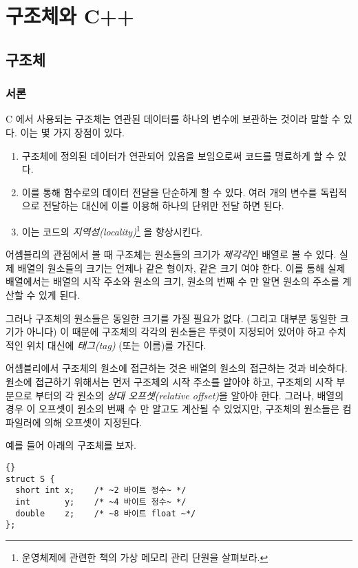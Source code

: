 ﻿%
\chapter{구조체와 C++}

\section{구조체}

\subsection{서론}

C 에서 사용되는 구조체는 연관된 데이터를 하나의 변수에 보관하는 것이라
말할 수 있다. 이는 몇 가지 장점이 있다. 

\begin{enumerate}
\item 구조체에 정의된 데이터가 연관되어 있음을 보임으로써 코드를 
      명료하게 할 수 있다. 
\item 이를 통해 함수로의 데이터 전달을 단순하게 할 수 있다. 여러 개의 변수를
      독립적으로 전달하는 대신에 이를 이용해 하나의 단위만 전달 하면 된다.
\item 이는 코드의 \emph{지역성(locality)}\footnote{운영체제에 관련한 책의 가상 메모리 관리 단원을 살펴보라.} 을 향상시킨다.
\end{enumerate}

어셈블리의 관점에서 볼 때 구조체는 원소들의 크기가 \emph{제각각}인 배열로 볼 수 있다. 실제 배열의
원소들의 크기는 언제나 같은 형이자, 같은 크기 여야 한다. 이를 통해 실제 배열에서는 배열의 시작 주소와
원소의 크기, 원소의 번째 수 만 알면 원소의 주소를 계산할 수 있게 된다.

그러나 구조체의 원소들은 동일한 크기를 가질 필요가 없다. (그리고 대부분 동일한 크기가 아니다)
이 때문에 구조체의 각각의 원소들은 뚜렷이 지정되어 있어야 하고 수치적인 위치 대신에
\emph{태그(tag)} (또는 이름)를 가진다. 

어셈블리에서 구조체의 원소에 접근하는 것은 배열의 원소의 접근하는 것과 비슷하다. 원소에 접근하기
위해서는 먼저 구조체의 시작 주소를 알아야 하고, 구조체의 시작 부분으로 부터의 각 원소의 \emph{상대 오프셋(relative offset)}을
알아야 한다. 그러나, 배열의 경우 이 오프셋이 원소의 번째 수 만 알고도 계산될 수 있었지만, 구조체의 원소들은
컴파일러에 의해 오프셋이 지정된다. 

예를 들어 아래의 구조체를 보자. 

\begin{lstlisting}[stepnumber=0, escapeinside=~~]{}
struct S {
  short int x;    /* ~2 바이트 정수~ */
  int       y;    /* ~4 바이트 정수~ */
  double    z;    /* ~8 바이트 float ~*/
};
\end{lstlisting}

